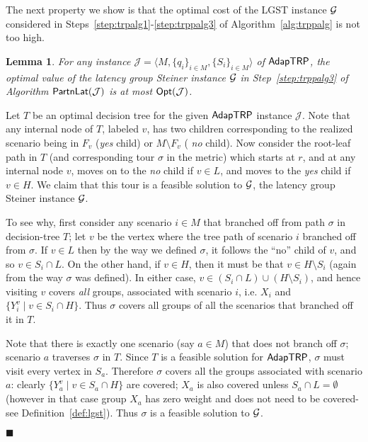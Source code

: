 \documentclass[11pt]{article}
\newtheorem{lemma}[thm]{Lemma}
\def\opt{{\sf Opt}\xspace}
\def\js{\ensuremath{\mathcal{J}}}
\def\palgl{\ensuremath{{\sf PartnLat}}\xspace}
\def\strp{\ensuremath{{\sf AdapTRP}}\xspace}
\def\lgs{{\sf LGST}\xspace}
\newenvironment{pf}{

\noindent{\bf Proof:}} {\hfill$\blacksquare$


}
\begin{document}
The next property we show is that the optimal cost of the \lgs instance ${\cal G}$ considered in
Steps~\eqref{step:trpalg1}-\eqref{step:trppalg3} of Algorithm~\ref{alg:trppalg} is not too high.


\begin{lemma} \label{lem:latbound}
  For any instance $\js = \langle M, \{q_i\}_{i\in M}, \{S_i\}_{i\in M}\rangle$ of \strp, the
  optimal value of the latency group Steiner instance ${\cal G}$  in
  Step~\ref{step:trppalg3} of Algorithm $\palgl(\js)$ is at most
  $\opt(\js)$.
\end{lemma}

\begin{pf}
Let $T$ be an optimal decision tree for the given  \strp instance $\js$. Note that any internal node of $T$, labeled
$v$, has two children corresponding to the realized scenario being in $F_v$ ({\em yes} child) or $M\setminus F_v$ ({\em
no} child). Now consider the root-leaf path in $T$ (and corresponding tour $\sigma$ in the metric) which starts at $r$,
and at any internal node $v$, moves on to the \emph{no} child if $v \in L$, and moves to  the \emph{yes} child if $v
\in H$. We claim that this tour is a feasible solution to ${\cal G}$, the latency group Steiner instance ${\cal G}$.

To see why, first consider any scenario $i\in M$ that branched off from path  $\sigma$ in decision-tree $T$; let $v$ be
the vertex where the tree path of scenario $i$ branched off from $\sigma$.  If $v \in L$ then by the way we defined
$\sigma$, it follows the ``no'' child of $v$, and so  $v\in S_i \cap L$.  On the other hand, if $v \in H$, then it
must be that $v \in H \setminus S_i$ (again from the way $\sigma$ was defined). In  either  case, $v\in (S_i \cap
L)\cup (H \setminus S_i)$, and hence visiting $v$ covers {\em all} groups, associated with scenario $i$, i.e. $X_i$ and $\{Y_i^v\mid v\in S_i\cap H\}$. Thus $\sigma$ covers all groups of all the scenarios that branched off it in $T$.

Note that there is exactly one scenario (say $a\in M$) that does not branch off $\sigma$; scenario $a$ traverses
$\sigma$ in $T$.
  Since $T$ is a feasible
  solution for \strp, $\sigma$ must visit every vertex in $S_a$.
  Therefore $\sigma$ covers all the groups associated with
  scenario $a$: clearly $\{Y_a^v\mid v\in S_a\cap H\}$ are covered; $X_a$ is also
  covered unless $S_a\cap L=\emptyset$ (however in that case group $X_a$ has zero weight and does not need to be covered- see Definition~\ref{def:lgst}). Thus $\sigma$ is a
  feasible solution to ${\cal G}$.


\end{pf}
\end{document}
